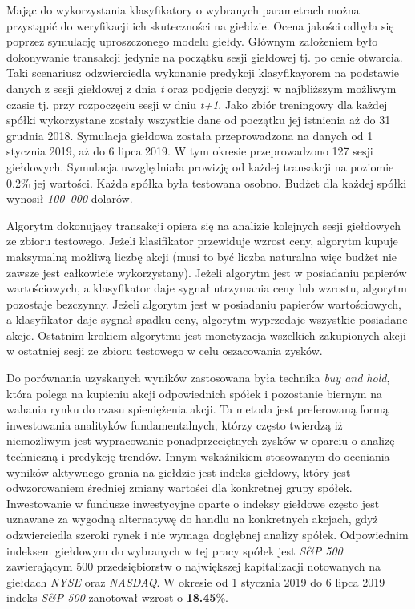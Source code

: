 \documentclass[a4paper, twoside, 11pt, openright]{article}
\begin{document}
Mając do wykorzystania klasyfikatory o wybranych parametrach można przystąpić do weryfikacji ich skuteczności na giełdzie. Ocena jakości odbyła się poprzez symulację uproszczonego modelu giełdy. Głównym założeniem było dokonywanie transakcji jedynie na początku sesji giełdowej tj. po cenie otwarcia. Taki scenariusz odzwierciedla wykonanie predykcji klasyfikayorem na podstawie danych z sesji giełdowej z dnia \textit{t} oraz podjęcie decyzji w najbliższym możliwym czasie tj. przy rozpoczęciu sesji w dniu \textit{t+1}. Jako zbiór treningowy dla każdej spółki wykorzystane zostały wszystkie dane od początku jej istnienia aż do 31 grudnia 2018. Symulacja giełdowa została przeprowadzona na danych od 1 stycznia 2019, aż do 6 lipca 2019. W tym okresie przeprowadzono 127 sesji giełdowych. Symulacja uwzględniała prowizję od każdej transakcji na poziomie 0.2\% jej wartości. Każda spółka była testowana osobno. Budżet dla każdej spółki wynosił \textit{100~000} dolarów.

\bigskip

Algorytm dokonujący transakcji opiera się na analizie kolejnych sesji giełdowych ze zbioru testowego. Jeżeli klasifikator przewiduje wzrost ceny, algorytm kupuje maksymalną możliwą liczbę akcji (musi to być liczba naturalna więc budżet nie zawsze jest całkowicie wykorzystany). Jeżeli algorytm jest w posiadaniu papierów wartościowych, a klasyfikator daje sygnał utrzymania ceny lub wzrostu, algorytm pozostaje bezczynny. Jeżeli algorytm jest w posiadaniu papierów wartościowych, a klasyfikator daje sygnał spadku ceny, algorytm wyprzedaje wszystkie posiadane akcje. Ostatnim krokiem algorytmu jest monetyzacja wszelkich zakupionych akcji w ostatniej sesji ze zbioru testowego w celu oszacowania zysków.

\bigskip

Do porównania uzyskanych wyników zastosowana była technika \textit{buy and hold}, która polega na kupieniu akcji odpowiednich spółek i pozostanie biernym na wahania rynku do czasu spieniężenia akcji.  Ta metoda jest preferowaną formą inwestowania analityków fundamentalnych, którzy często twierdzą iż niemożliwym jest wypracowanie ponadprzeciętnych zysków w oparciu o analizę techniczną i predykcję trendów. Innym wskaźnikiem stosowanym do oceniania wyników aktywnego grania na giełdzie jest indeks giełdowy, który jest odwzorowaniem średniej zmiany wartości dla konkretnej grupy spółek. Inwestowanie w fundusze inwestycyjne oparte o indeksy giełdowe często jest uznawane za wygodną alternatywę do handlu na konkretnych akcjach, gdyż odzwierciedla szeroki rynek i nie wymaga dogłębnej analizy spółek.  Odpowiednim indeksem giełdowym do wybranych w tej pracy spółek jest \textit{S\&P 500} zawierającym 500 przedsiębiorstw o największej kapitalizacji notowanych na giełdach \textit{NYSE} oraz \textit{NASDAQ}. W okresie od 1 stycznia 2019 do 6 lipca 2019 indeks \textit{S\&P 500} zanotował wzrost o \textbf{18.45}\%.
\end{document}
